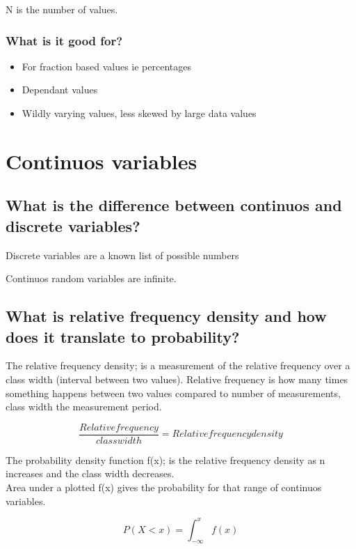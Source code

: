 \documentclass[11pt]{scrartcl} %
\begin{document}
N is the number of values.

\subsubsection{What is it good for?}

\begin{itemize}
	\item For fraction based values ie percentages
	\item Dependant values
	\item Wildly varying values, less skewed by large data values
\end{itemize}

\section{Continuos variables}

\subsection{What is the difference between continuos and discrete
variables?}

Discrete variables are a known list of possible numbers

Continuos random variables are infinite.

\subsection{What is relative frequency density and how does it
translate to
probability?}

The relative frequency density; is a measurement of the relative
frequency over a class width (interval between two values). Relative frequency is how many times 
something happens between two values compared to number of measurements, 
class width the measurement period.

\begin{equation}
	\frac{Relative frequency}{class width} = Relative frequency density
\end{equation}

The probability density function f(x); is the relative frequency density
as n increases and the class width decreases.\\

Area under a plotted f(x) gives the probability for that range of
continuos variables.

\begin{equation}
	P(X<x) = \int_{-\infty}^{x} f(x)
\end{equation}
\end{document}
